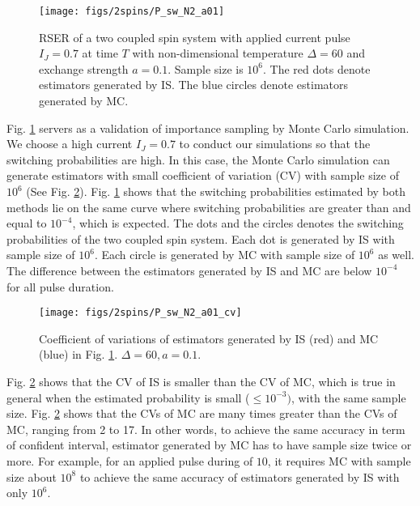 \documentclass[journal,transmag]{IEEEtran}
\begin{document}
  \begin{figure}[h]
   \centering
         \texttt{[image: figs/2spins/P\_sw\_N2\_a01]}
   \caption{RSER of a two coupled spin system with applied current pulse $I_J = 0.7$ at time $T$ with non-dimensional temperature $\Delta = 60$ and exchange strength $ a = 0.1$. Sample size is $10^6$. The red dots denote estimators generated by IS.  The blue circles denote estimators generated by MC.  }
   \label{figs:ISvsMC1_1}
\end{figure}
Fig. \ref{figs:ISvsMC1_1} servers as a validation of importance sampling by Monte Carlo simulation. We choose a high current $I_J = 0.7$ to conduct our simulations so that the switching probabilities are high. In this case, the Monte Carlo simulation can generate estimators with small coefficient of variation (CV) with sample size of $10^6$ (See Fig. \ref{figs:ISvsMC1_2}).
Fig. \ref{figs:ISvsMC1_1}  shows that the switching probabilities estimated by both methods lie on the same curve where switching probabilities are greater than and equal to $10^{-4}$, which is expected. The dots and the circles denotes the switching probabilities of the two coupled spin system. Each dot is generated by IS with sample size of $10^6$. Each circle is generated by MC with sample size of $10^6$ as well.  The difference between the estimators generated by IS and MC are below $10^{-4}$ for all pulse duration.
  \begin{figure}[h]
   \centering
         \texttt{[image: figs/2spins/P\_sw\_N2\_a01\_cv]}
   \caption{Coefficient of variations of estimators generated by IS (red) and MC (blue) in Fig. \ref{figs:ISvsMC1_1}. $\Delta = 60, a = 0.1$. }
   \label{figs:ISvsMC1_2}
\end{figure}
%
Fig. \ref{figs:ISvsMC1_2} shows that the CV of IS is smaller than the CV of MC, which is true in general when the estimated probability is small ($ \le 10^{-3})$, with the same sample size. Fig. \ref{figs:ISvsMC1_2} shows that the CVs of MC are many times greater than the CVs of MC, ranging from 2 to 17. In other words, to achieve the same accuracy in term of confident interval, estimator generated by MC has to have sample size twice or more. For example, for an applied pulse during of $10$, it requires MC with sample size about $10^8$ to achieve the same accuracy of estimators generated by IS with only $10^6$.
%
\end{document}
